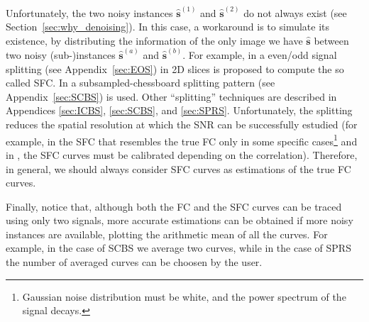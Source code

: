 Unfortunately, the two noisy instances $\hat{\mathbf{s}}^{(1)}$ and
$\hat{\mathbf{s}}^{(2)}$ do not always exist (see
Section~\ref{sec:why_denoising}).  In this case, a workaround is to
simulate its existence, by distributing the information of the only
image we have $\hat{\mathbf{s}}$ between two noisy
(sub-)instances $\hat{\mathbf{s}}^{(a)}$ and
$\hat{\mathbf{s}}^{(b)}$. For example, in \cite{verbeke2024self} a
even/odd signal splitting (see Appendix~\ref{sec:EOS}) in 2D slices is
proposed to compute the so called \gls{SFC}. In \cite{koho2019fourier}
a subsampled-chessboard splitting pattern (see
Appendix~\ref{sec:SCBS}) is used. Other ``splitting'' techniques are
described in Appendices \ref{sec:ICBS}, \ref{sec:SCBS}, and
\ref{sec:SPRS}. Unfortunately, the splitting reduces the spatial
resolution at which the \gls{SNR} can be successfully
estudied (for example, in \cite{verbeke2024self} the \gls{SFC} that
resembles the true \gls{FC} only in some specific cases\footnote{Gaussian
  noise distribution must be white, and the power spectrum of the
  signal decays.} and in \cite{koho2019fourier}, the \gls{SFC} curves
must be calibrated depending on the correlation). Therefore, in
general, we should always consider \gls{SFC} curves as estimations of
the true \gls{FC} curves.

Finally, notice that, although both the \gls{FC} and the \gls{SFC} curves
can be traced using only two signals, more accurate estimations can be
obtained if more noisy instances are available, plotting the arithmetic mean
of all the curves. For example, in the case of \gls{SCBS} we average two
curves, while in the case of \gls{SPRS} the number of averaged curves can be
choosen by the user.

\begin{comment}
Finally, notice that it is possible to compute the so called Self FC
(SFC in general, specifically SFSC for the 3D case and SFRC for the 2D
one), using some technique to simulate the existence of (at
least\footnote{When it is possible to use more instances, the
  resulting curve is the mean of all the curves.}) two
``noisy''\footnote{In real scenarios, where it is possible to take two
  (or more) captures of the same view, the only that should
  distinguish the instances is the noise. Notice that, if the views
  were different, the uncorrelated noise is also present.} instances,
$\hat{\mathbf{X}}^{(1)}$ and $\hat{\mathbf{X}}^{(2)}$. For example, in
\cite{verbeke2024self} a even/odd signal splitting (see
Appendix~\ref{sec:EOS}) in 2D slices is proposed to compute the SFC
that resembles the true FC in some specific cases. In
\cite{koho2019fourier} a subsampled-chessboard splitting pattern (see
Appendix~\ref{sec:SCBS}) is used to compute SFC curves. Notice that,
to resemble the true FC curves, they must be calibrated for some
correlation threshold.
\end{comment}

